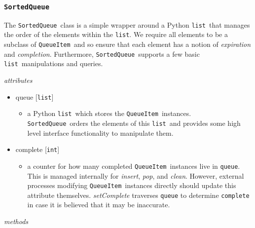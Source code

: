 \documentclass{article}
\newcommand{\SortedQueue}{\texttt{SortedQueue}}
\newcommand{\QueueItem}{\texttt{QueueItem}}
\newcommand{\pythonint}{\texttt{int}}
\newcommand{\pythonlist}{\texttt{list}}
\begin{document}

\subsubsection{\SortedQueue}
\label{sec: SortedQueue}

The \SortedQueue~class is a simple wrapper around a Python \pythonlist~that manages the order of the elements within the \pythonlist.
We require all elements to be a subclass of \QueueItem~and so ensure that each element has a notion of \textit{expiration} and \textit{completion}.
Furthermore, \SortedQueue~supports a few basic \pythonlist~manipulations and queries.

\vspace{0.5cm}
\noindent
\textit{attributes}

\begin{itemize}
    \item{queue [\pythonlist]
        \begin{itemize}
            \item{a Python \pythonlist~which stores the \QueueItem~instances. \SortedQueue~orders the elements of this \pythonlist~and provides some high level interface functionality to manipulate them.}
        \end{itemize}
         }
    \item{complete [\pythonint]
        \begin{itemize}
            \item{a counter for how many completed \QueueItem~instances live in \texttt{queue}. This is managed internally for \textit{insert}, \textit{pop}, and \textit{clean}. However, external processes modifying \QueueItem~instances directly should update this attribute themselves. \textit{setComplete} traverses \texttt{queue} to determine \texttt{complete} in case it is believed that it may be inaccurate.}
        \end{itemize}
         }
\end{itemize}

\noindent
\textit{methods}
\end{document}
